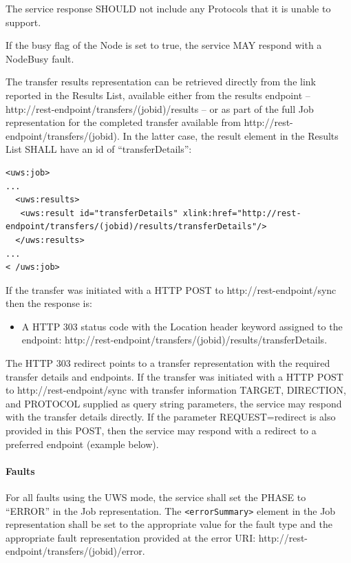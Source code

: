 \documentclass[11pt,a4paper]{ivoa}
\begin{document}
The service response SHOULD not include any Protocols that it is unable to support.

If the busy flag of the Node is set to true, the service MAY respond with a NodeBusy fault.

The transfer results representation can be retrieved directly from the link reported in the Results List, available either from the results endpoint -- http://rest-endpoint/transfers/(jobid)/results -- or as part of the full Job representation for the completed transfer available from http://rest-endpoint/transfers/(jobid). In the latter case, the result element in the Results List SHALL have an id of ``transferDetails'':
\begin{lstlisting}
<uws:job>
...
  <uws:results>
   <uws:result id="transferDetails" xlink:href="http://rest-endpoint/transfers/(jobid)/results/transferDetails"/>
  </uws:results>
...
< /uws:job>
\end{lstlisting}
If the transfer was initiated with a HTTP POST to http://rest-endpoint/sync then the response is:
\begin{itemize}
    \item A HTTP 303 status code with the Location header keyword assigned to the endpoint: http://rest-endpoint/transfers/(jobid)/results/transferDetails.
\end{itemize}
The HTTP 303 redirect points to a transfer representation with the required transfer details and endpoints.
If the transfer was initiated with a HTTP POST to http://rest-endpoint/sync with transfer information TARGET, DIRECTION, and PROTOCOL supplied as query string parameters, the service may respond with the transfer details directly. If the parameter REQUEST=redirect is also provided in this POST, then the service may respond with a redirect to a preferred endpoint (example below).

\paragraph{Faults}
For all faults using the UWS mode, the service shall set the PHASE to ``ERROR'' in the Job representation. The \verb|<errorSummary>| element in the Job representation shall be set to the appropriate value for the fault type and the appropriate fault representation provided at the error URI: http://rest-endpoint/transfers/(jobid)/error.
\end{document}
